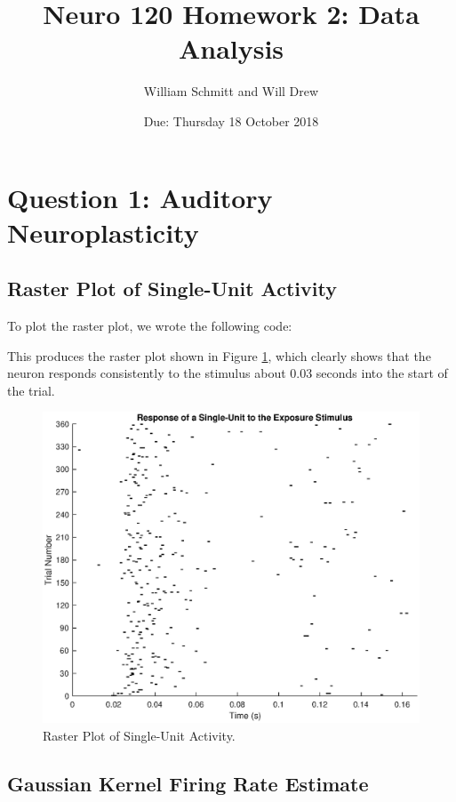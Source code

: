 \documentclass[11pt, oneside]{article}
\title{Neuro 120 Homework 2: Data Analysis}
\author{William Schmitt and Will Drew}
\date{Due: Thursday 18 October 2018}
\begin{document}
\maketitle

\section{Question 1: Auditory Neuroplasticity}

\subsection{Raster Plot of Single-Unit Activity}

To plot the raster plot, we wrote the following code:

This produces the raster plot shown in Figure \ref{fig:RasterPlot}, which clearly shows that the neuron responds consistently to the stimulus about 0.03 seconds into the start of the trial.

\begin{figure}[ht!]
\includegraphics[width=1\textwidth]{RasterPlot.eps}
\caption{Raster Plot of Single-Unit Activity.}
\label{fig:RasterPlot}
\end{figure}

\subsection{Gaussian Kernel Firing Rate Estimate}
\end{document}

